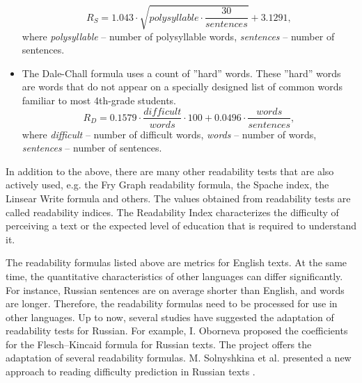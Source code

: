\documentclass[runningheads]{llncs}
\begin{document}
\begin{itemize}
    \begin{equation}
      \textit{R}_\textit{S} = 1.043\cdot \sqrt{polysyllable\cdot \frac{30}{sentences}}+3.1291,
    \end{equation}
    where \textit{polysyllable} -- number of polysyllable words,
    \textit{sentences} -- number of sentences.
    \item The Dale-Chall formula uses a count of ''hard'' words. These ''hard'' words are words that do not appear on a specially designed list of common words familiar to most 4th-grade students.
    \begin{equation}
      \textit{R}_\textit{D} = 0.1579\cdot \frac{difficult}{words}\cdot 100 + 0.0496\cdot \frac{words}{sentences},
    \end{equation}
    where \textit{difficult} -- number of difficult words,
    \textit{words} -- number of words,
    \textit{sentences} -- number of sentences.
\end{itemize}

In addition to the above, there are many other readability tests that are also actively used, e.g. the Fry Graph readability formula, the Spache index, the Linsear Write formula and others. The values obtained from readability tests are called readability indices. The Readability Index characterizes the difficulty of perceiving a text or the expected level of education that is required to understand it.

The readability formulas listed above are metrics for English texts. At the same time, the quantitative characteristics of other languages can differ significantly. For instance, Russian sentences are on average shorter than English, and words are longer. Therefore, the readability formulas need to be processed for use in other languages. Up to now, several studies have suggested the adaptation of readability tests for Russian. For example, I. Oborneva \cite{Oborneva} proposed the coefficients for the Flesch–Kincaid formula for Russian texts. The project \cite{readability} offers the adaptation of several readability formulas. M. Solnyshkina et al. presented a new approach to reading difficulty prediction in Russian texts \cite{Solnyshkina,Solovyev}. 
\end{document}
